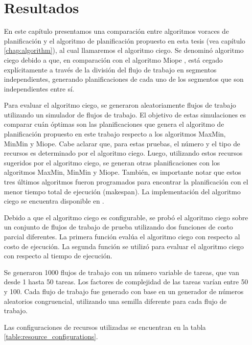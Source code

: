 \chapter{Resultados}
\label{chap:results}


En este capítulo presentamos una comparación entre algoritmos voraces de planificación y el algoritmo de planificación propuesto en esta tesis (vea capítulo \ref{chap:algorithm}), al cual llamaremos el algoritmo ciego. Se denominó algoritmo ciego debido a que, en comparación con el algoritmo Miope \cite{ramamritham1990efficient}, está cegado explícitamente a través de la división del flujo de trabajo en segmentos independientes, generando planificaciones de cada uno de los segmentos que son independientes entre sí.

Para evaluar el algoritmo ciego, se generaron aleatoriamente flujos de trabajo utilizando un simulador de flujos de trabajo. El objetivo de estas simulaciones es comparar cuán óptimas son las planificaciones que genera el algoritmo de planificación propuesto en este trabajo respecto a los algoritmos MaxMin, MinMin y Miope. Cabe aclarar que, para estas pruebas, el número y el tipo de recursos es determinado por el algoritmo ciego. Luego, utilizando estos recursos sugeridos por el algoritmo ciego, se generan otras planificaciones con los algoritmos MaxMin, MinMin y Miope. También, es importante notar que estos tres \'ultimos algoritmos fueron programados para encontrar la planificación con el menor tiempo total de ejecución (makespan). La implementaci\'on del algoritmo ciego se encuentra disponible en \cite{dominofire2014workflowsimulator}.

Debido a que el algoritmo ciego es configurable, se prob\'o el algoritmo ciego sobre un conjunto de flujos de trabajo de prueba utilizando dos funciones de costo parcial diferentes. La primera funci\'on evalúa el algoritmo ciego con respecto al costo de ejecución. La segunda funci\'on se utiliz\'o para evaluar el algoritmo ciego con respecto al tiempo de ejecuci\'on.

Se generaron 1000 flujos de trabajo con un número variable de tareas, que van desde 1 hasta 50 tareas. Los factores de complejidad de las tareas varían entre 50 y 100. Cada flujo de trabajo fue generado con base en un generador de números aleatorios congruencial, utilizando una semilla diferente para cada flujo de trabajo.

Las configuraciones de recursos utilizadas se encuentran en la tabla \ref{table:resource_configurations}.

